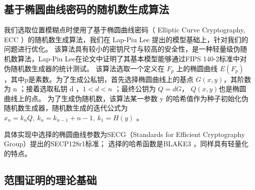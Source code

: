 \documentclass[zihao=-4]{ctexart}
\begin{document}
\subsection{基于椭圆曲线密码的随机数生成算法}
我们选取位置模糊点时使用了基于椭圆曲线密码（ Elliptic Curve Cryptography, ECC ）的随机数生成算法，我们在 Lap-Piu Lee 提出的模型基础上\cite{yjw}，针对我们的问题进行优化。
该算法具有较小的密钥尺寸与较高的安全性，是一种轻量级伪随机数算法，Lap-Piu Lee在论文中证明了其基本模型能够通过FIPS 140-2标准中对伪随机数生成器的统计测试。\cite{yjw}
该算法选取一个定义在 $F_p$ 上的椭圆曲线 $E(F_p)$ ，其中p是素数。为了生成公私钥，首先选择椭圆曲线上的基点 $G(x,y)$，其阶数为 n ；接着选取私钥 d ，$1<d<n$ ；最终公钥为 $Q=dG$， $Q(x,y)$也是椭圆曲线上的点。
为了生成伪随机数，该算法某一参数 y 的哈希值作为种子初始化伪随机数生成器，随机数生成的迭代公式为 $x_n=k_nQ,\ k_n=k_{n-1}+n-1,\ k_1=H(y)$ 。
\par
具体实现中选择的椭圆曲线参数为SECG（Standards for Efficient Cryptography Group）提出的SECP128r1标准；
选择的哈希函数是BLAKE3 ，同样具有轻量化的特点。

\subsection{范围证明的理论基础}
\end{document}
